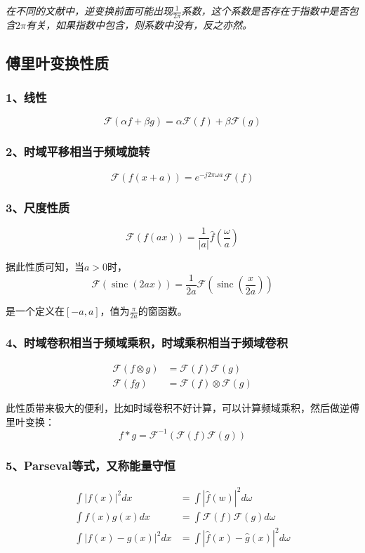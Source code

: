 	\textit{在不同的文献中，逆变换前面可能出现$\frac{1}{2\pi}$系数，这个系数是否存在于指数中是否包含$2\pi$有关，如果指数中包含，则系数中没有，反之亦然。}

\subsection{傅里叶变换性质}	
	\subsubsection*{1、线性} 
		$$
			\mathcal{F}(\alpha f + \beta g) = \alpha \mathcal{F}(f) + \beta \mathcal{F}(g)
		$$
	\subsubsection*{2、时域平移相当于频域旋转}
		$$
			\mathcal{F}(f(x+a)) = e^{-j2\pi\omega a}\mathcal{F}(f)
		$$
	\subsubsection*{3、尺度性质}
		$$
			\mathcal{F}(f(ax)) = \frac{1}{|a|}\hat{f}(\frac{\omega}{a})
		$$

		据此性质可知，当$a>0$时，
		$$
			\mathcal{F}(\mathop{sinc}(2ax)) = \frac{1}{2a}\mathcal{F}(\mathop{sinc}(\frac{x}{2a}))
		$$

		是一个定义在$[-a,a]$，值为$\frac{\pi}{2a}$的窗函数。

	\subsubsection*{4、时域卷积相当于频域乘积，时域乘积相当于频域卷积}
		\begin{align*}
			\mathcal{F}(f \otimes g) &= \mathcal{F}(f) \mathcal{F}(g)\\
			\mathcal{F}(fg) &= \mathcal{F}(f) \otimes \mathcal{F}(g)
		\end{align*}

		此性质带来极大的便利，比如时域卷积不好计算，可以计算频域乘积，然后做逆傅里叶变换：
		$$
			f*g =\mathcal{F}^{-1}\left(\mathcal{F}(f) \mathcal{F}(g)\right)
		$$
	\subsubsection*{5、Parseval等式，又称能量守恒}
		\begin{equation}\label{parseval_eq}
			\begin{aligned}
				\int |f(x)|^2dx &= \int |\hat{f}(w)|^2d\omega\\
				\int f(x)g(x)dx &= \int \mathcal{F}(f)\mathcal{F}(g)d\omega\\
				\int \left|f(x) - g(x)\right|^2dx &= \int \left|\hat{f}(x) - \hat{g}(x)\right|^2d\omega
			\end{aligned}
		\end{equation}
		
